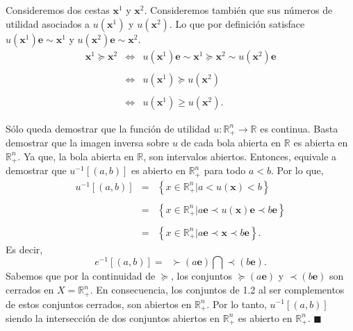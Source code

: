 \begin{enumerate}
	Consideremos dos cestas $\textbf{x}^1$ y $\textbf{x}^2$. Consideremos también que sus números de utilidad asociados a $u(\textbf{x}^1)$ y $u(\textbf{x}^2)$. Lo que por definición satisface $u(\textbf{x}^1)\textbf{e}\sim\textbf{x}^1$ y $u(\textbf{x}^2)\textbf{e}\sim\textbf{x}^2$. 
	$$
	\begin{array}{rcl}
	    \textbf{x}^1 \succeq \textbf{x}^2 &\iff& u(\textbf{x}^1)\textbf{e}\sim \textbf{x}^1\succeq \textbf{x}^2 \sim u(\textbf{x}^2)\textbf{e}\\\\
					      &\iff& u(\textbf{x}^1)\succeq u(\textbf{x}^2)\\\\
					      &\iff& u(\textbf{x}^1)\geq u(\textbf{x}^2).
	\end{array}
	$$

	Sólo queda demostrar que la función de utilidad $u:\mathbb{R}_+^n\to \mathbb{R}$ es continua. Basta demostrar que la imagen inversa sobre $u$ de cada bola abierta en $\mathbb{R}$ es abierta en $\mathbb{R}_+^n$. Ya que, la bola abierta en $\mathbb{R}$, son intervalos abiertos. Entonces, equivale a demostrar que $u^{-1}\left[(a,b)\right]$ es abierto en $\mathbb{R}_+^n$ para todo $a<b$. Por lo que,
	$$
	\begin{array}{rcl}
	    u^{-1}\left[(a,b)\right] &=& \left\{x\in \mathbb{R}_+^n | a<u(\textbf{x}) < b\right\}\\\\
				     &=& \left\{x\in \mathbb{R}_+^n | a\textbf{e}\prec u(\textbf{x})\textbf{e} \prec b\textbf{e}\right\}\\\\
				     &=& \left\{x\in \mathbb{R}_+^n | a\textbf{e}\prec \textbf{x} \prec b\textbf{e}\right\}.
	\end{array}
	$$
	Es decir,
	\begin{equation}
	    e^{-1}\left[(a,b)\right]=\;\; \succ (a\textbf{e}) \bigcap \prec (b\textbf{e}).
	\end{equation}
	Sabemos que por la continuidad de $\succeq$, los conjuntos $\succeq (a\textbf{e})$ y $\prec (b\textbf{e})$ son cerrados en $X=\mathbb{R}_+^n$. En consecuencia, los conjuntos de 1.2 al ser complementos de estos conjuntos cerrados, son abiertos en $\mathbb{R}_+^n$. Por lo tanto, $u^{-1}\left[(a,b)\right]$ siendo la intersección de dos conjuntos abiertos en $\mathbb{R}^n_+$ es abierto en $\mathbb{R}_+^n$. $\blacksquare$

\end{enumerate}


